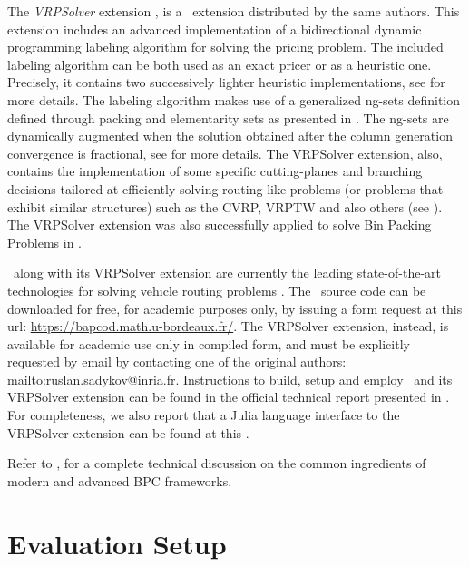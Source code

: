 The \textit{VRPSolver} extension \parencite{pessoa2020a}, is
a \bapcod\ extension distributed by the same authors.
This extension includes an
advanced implementation of a bidirectional dynamic programming labeling algorithm
\parencite{sadykov2021a} for solving the pricing problem.
The included labeling algorithm
can be both used as an exact pricer or as a heuristic one.
Precisely, it contains two successively lighter heuristic implementations, see \textcite{sadykov2021a} for more details.
The labeling algorithm makes use of a generalized ng-sets definition \parencite{baldacci2011}
defined through packing and elementarity sets as presented in \textcite{pessoa2020a}.
The ng-sets are dynamically augmented \parencite{roberti2014}
when the solution obtained after the column generation convergence
is fractional,
see \textcite{pessoa2020a} for more details.
The VRPSolver extension, also,
contains the implementation of some
specific cutting-planes and branching decisions
tailored at efficiently solving routing-like problems
(or problems that exhibit similar structures)
such as the CVRP, VRPTW and also others (see \cite{pessoa2020a}).
The VRPSolver extension was also successfully applied
to solve Bin Packing Problems in \textcite{pessoa2020}.

\medskip

\bapcod\ along with its VRPSolver extension are currently the leading state-of-the-art
technologies for solving vehicle routing problems \parencite{pessoa2020a}.
The \bapcod\ source code can be downloaded for free, for academic purposes only,
by issuing a form request at this url: \url{https://bapcod.math.u-bordeaux.fr/}.
The VRPSolver extension, instead, is available for academic use only in compiled form,
and must be explicitly requested by email by contacting one of the
original authors: \url{mailto:ruslan.sadykov@inria.fr}.
Instructions to build, setup and employ \bapcod\ and its VRPSolver extension
can be found in the official technical report presented in \textcite{sadykov2021}.
For completeness, we also report that
a Julia language interface to the VRPSolver extension
can be found at this
.

Refer to \textcite{sadykov2019b},
for a complete technical discussion on the common ingredients of modern and advanced BPC frameworks.

\section{Evaluation Setup}
\label{sec:results-evaluation-setup}

